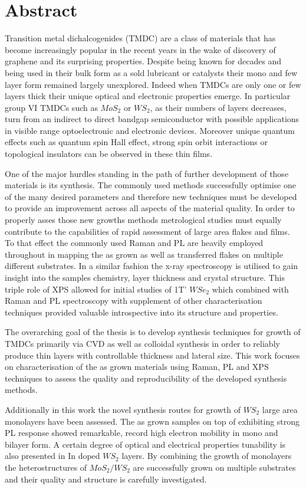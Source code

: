 \section*{Abstract}

Transition metal dichalcogenides (TMDC) are a class of materials that has become increasingly popular in the recent years in the wake of discovery of graphene and its surprising properties. Despite being known for decades and being used in their bulk form as a sold lubricant or catalysts their mono and few layer form remained largely unexplored. Indeed when TMDCs are only one or few layers thick their unique optical and electronic properties emerge. In particular group VI TMDCs such as $MoS_2$ or $WS_2$, as their numbers of layers decreases, turn from an indirect to direct bandgap semiconductor with possible applications in visible range optoelectronic and electronic devices. Moreover unique quantum effects such as quantum spin Hall effect, strong spin orbit interactions or topological insulators can be observed in these thin films.

One of the major hurdles standing in the path of further development of those materials is its synthesis. The commonly used methods successfully optimise one of the many desired parameters and therefore new techniques must be developed to provide an improvement across all aspects of the material quality. In order to properly asses those new growths methods metrological studies must equally contribute to the capabilities of rapid assessment of large area flakes and films. To that effect the commonly used Raman and PL are heavily employed throughout in mapping the as grown as well as transferred flakes on multiple different substrates. In a similar fashion the x-ray spectroscopy is utilised to gain insight into the samples chemistry, layer thickness and crystal structure. This triple role of XPS allowed for initial studies of 1T' $WSe_2$ which combined with Raman and PL spectroscopy with supplement of other characterisation techniques provided valuable introspective into its structure and properties.

The overarching goal of the thesis is to develop synthesis techniques for growth of TMDCs primarily via CVD as well as colloidal synthesis in order to reliably produce thin layers with controllable thickness and lateral size. This work focuses on characterisation of the as grown materials using Raman, PL and XPS techniques to assess the quality and reproducibility of the developed synthesis methods.

Additionally in this work the novel synthesis routes for growth of $WS_2$ large area monolayers have been assessed. The as grown samples on top of exhibiting strong PL response showed remarkable, record high electron mobility in mono and bilayer form. A certain degree of optical and electrical properties tunability is also presented in In doped $WS_2$ layers. By combining the growth of monolayers the heterostructures of $MoS_2/WS_2$ are successfully grown on multiple substrates and their quality and structure is carefully investigated.